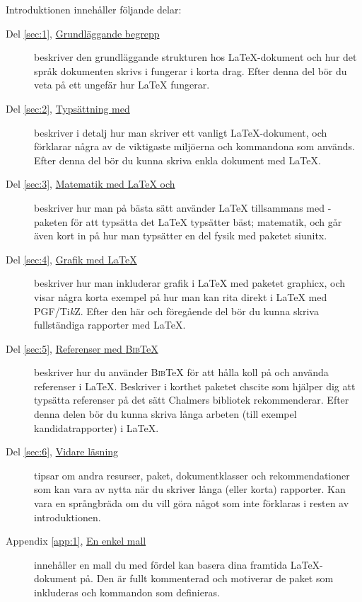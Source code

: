 \documentclass[draft,swe,10pt,nofont]{skrapport}
\makeatletter
\let\@oldLaTeX\LaTeX
\def\LaTeX{\texorpdfstring{\@oldLaTeX}{LaTeX}}
\let\@oldAmS\AmS
\def\AmS{\texorpdfstring{\@oldAmS}{AMS}}
\newcommand\pack[1]{\textsf{#1}}						%
\newcommand\pdfLaTeX{\hologo{pdfLaTeX}\xspace}			%
\newcommand\BibTeX{\textsc{Bib}\TeX\xspace}				%
\newcommand\PGFTikZ{PGF/Ti\emph{k}Z\xspace}				%
\makeatother
\begin{document}
	Introduktionen innehåller följande delar:
	\begin{description}
		\item[{Del \ref{sec:1}, \hyperref[sec:1]{Grundläggande begrepp}}]
		beskriver den grundläggande strukturen hos \LaTeX-dokument och hur det
		språk dokumenten skrivs i fungerar i korta drag. Efter denna del bör
		du veta på ett ungefär hur \LaTeX{} fungerar.
		
		\item[{Del \ref{sec:2}, \hyperref[sec:2]{Typsättning med \pdfLaTeX}}]
		beskriver i detalj hur man skriver ett vanligt
		\LaTeX-dokument, och förklarar några av de viktigaste miljöerna
		och kommandona som används. Efter denna del bör du kunna skriva enkla
		dokument med \LaTeX.
		
		\item[{Del \ref{sec:3}, \hyperref[sec:3]{Matematik med \LaTeX{} och 
		\AmS}}]
		beskriver hur man på bästa sätt använder \LaTeX{} tillsammans med
		\AmS-paketen för att typsätta det \LaTeX{} typsätter bäst; matematik,
		och går även kort in på hur man typsätter en del fysik med paketet
		\pack{siunitx}.
		
		\item[{Del \ref{sec:4}, \hyperref[sec:4]{Grafik med \LaTeX}}]
		beskriver hur man inkluderar grafik i \LaTeX{} med paketet
		\pack{graphicx}, och visar några korta exempel på hur man kan rita
		direkt i \LaTeX{} med \PGFTikZ{}. Efter den här och föregående del bör
		du kunna skriva fullständiga rapporter med \LaTeX.
		
		\item[{Del \ref{sec:5}, \hyperref[sec:5]{Referenser med \BibTeX}}]
		beskriver hur du använder \BibTeX{} för att hålla koll på och använda
		referenser i \LaTeX. Beskriver i korthet paketet \pack{chscite} som
		hjälper dig att typsätta referenser på det sätt Chalmers bibliotek
		rekommenderar. Efter denna delen bör du kunna skriva långa arbeten
		(till exempel kandidatrapporter) i \LaTeX.
		
		\item[{Del \ref{sec:6}, \hyperref[sec:6]{Vidare läsning}}]
		tipsar om andra resurser, paket, dokumentklasser och rekommendationer
		som kan vara av nytta när du skriver långa (eller korta) rapporter.
		Kan vara en språngbräda om du vill göra något som inte förklaras i
		resten av introduktionen.
		
		\item[Appendix \ref{app:1}, {\hyperref[app:1]{En enkel mall}}]
		innehåller en mall du med fördel kan basera dina framtida 
		\LaTeX{}-dokument
		på. Den är fullt kommenterad och motiverar de paket som inkluderas och
		kommandon som definieras.
	\end{description}
	
\end{document}

